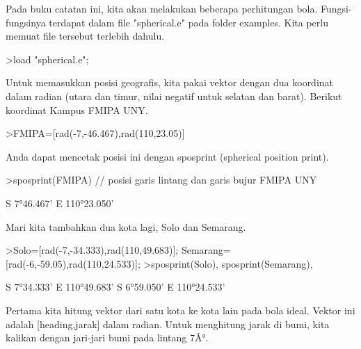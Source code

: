 \documentclass[a4paper,10pt]{article}
\begin{document}
\begin{eulernotebook}
\begin{eulercomment}
\begin{eulercomment}
\begin{eulercomment}
\begin{eulercomment}
\begin{eulercomment}
\begin{eulercomment}
\begin{eulercomment}
\begin{eulercomment}
\begin{eulercomment}
\begin{eulercomment}
\begin{eulercomment}
\begin{eulercomment}
\begin{eulercomment}
\begin{eulercomment}
\begin{eulercomment}
\begin{eulercomment}
\begin{eulercomment}
\begin{eulercomment}
\begin{eulercomment}
\end{eulercomment}
\begin{eulercomment}
Pada buku catatan ini, kita akan melakukan beberapa perhitungan bola. Fungsi-fungsinya
terdapat dalam file "spherical.e" pada folder examples. Kita perlu memuat file tersebut
terlebih dahulu.
\end{eulercomment}
\begin{eulerprompt}
>load "spherical.e";
\end{eulerprompt}
\begin{eulercomment}
Untuk memasukkan posisi geografis, kita pakai vektor dengan dua koordinat dalam radian (utara
dan timur, nilai negatif untuk selatan dan barat). Berikut koordinat Kampus FMIPA UNY.
\end{eulercomment}
\begin{eulerprompt}
>FMIPA=[rad(-7,-46.467),rad(110,23.05)]
\end{eulerprompt}
\begin{euleroutput}
  [-0.13569,  1.92657]
\end{euleroutput}
\begin{eulercomment}
Anda dapat mencetak posisi ini dengan sposprint (spherical position print).
\end{eulercomment}
\begin{eulerprompt}
>sposprint(FMIPA) // posisi garis lintang dan garis bujur FMIPA UNY
\end{eulerprompt}
\begin{euleroutput}
  S 7°46.467' E 110°23.050'
\end{euleroutput}
\begin{eulercomment}
Mari kita tambahkan dua kota lagi, Solo dan Semarang.
\end{eulercomment}
\begin{eulerprompt}
>Solo=[rad(-7,-34.333),rad(110,49.683)]; Semarang=[rad(-6,-59.05),rad(110,24.533)];
>sposprint(Solo), sposprint(Semarang),
\end{eulerprompt}
\begin{euleroutput}
  S 7°34.333' E 110°49.683'
  S 6°59.050' E 110°24.533'
\end{euleroutput}
\begin{eulercomment}
Pertama kita hitung vektor dari satu kota ke kota lain pada bola ideal. Vektor ini adalah
[heading,jarak] dalam radian. Untuk menghitung jarak di bumi, kita kalikan dengan jari-jari
bumi pada lintang 7Â°.
\end{eulercomment}

\end{eulercomment}
\end{eulercomment}
\end{eulercomment}
\end{eulercomment}
\end{eulercomment}
\end{eulercomment}
\end{eulercomment}
\end{eulercomment}
\end{eulercomment}
\end{eulercomment}
\end{eulercomment}
\end{eulercomment}
\end{eulercomment}
\end{eulercomment}
\end{eulercomment}
\end{eulercomment}
\end{eulercomment}
\end{eulercomment}
\end{eulernotebook}
\end{document}
